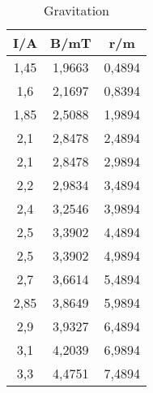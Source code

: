 %
%
%
%
%




\begin{table}[h!]
  \centering
  \caption{Gravitation}
  \label{tab:grav}
  \begin{tabular}{c c c  }
    \toprule
     I/A &		B/mT	& r/m	 \\
    \midrule
    1,45 &	1,9663	& 		0,4894\\
    1,6	 &	2,1697	& 		0,8394\\
    1,85 &	2,5088	& 		1,9894\\
    2,1	 &	2,8478	& 	  2,4894\\
    2,1	 &	2,8478	& 	  2,9894\\
    2,2	 &	2,9834	& 		3,4894\\
    2,4	 &	3,2546	& 		3,9894\\
    2,5	 &	3,3902	& 		4,4894\\
    2,5	 &	3,3902	& 		4,9894\\
    2,7	 &	3,6614	& 		5,4894\\
    2,85 &	3,8649	& 		5,9894\\
    2,9	 &	3,9327	& 		6,4894\\
    3,1	 &	4,2039	& 		6,9894\\
    3,3	 &	4,4751	& 		7,4894\\
    \bottomrule
  \end{tabular}
\end{table}

%
